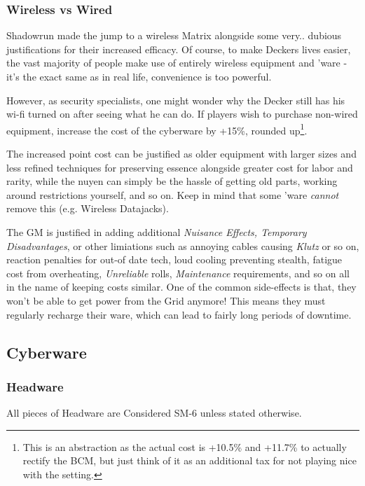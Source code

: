 \begin{multicols*}{3}
	\subsubsection{Wireless vs Wired}
	
	Shadowrun made the jump to a wireless Matrix alongside some very.. dubious justifications for their increased efficacy. Of course, to make Deckers lives easier, the vast majority of people make use of entirely wireless equipment and 'ware - it's the exact same as in real life, convenience is too powerful. 
	
	However, as security specialists, one might wonder why the Decker still has his wi-fi turned on after seeing what he can do. If players wish to purchase non-wired equipment, increase the cost of the cyberware by +15\%, rounded up\footnote{This is an abstraction as the actual cost is +10.5\% and +11.7\% to actually rectify the BCM, but just think of it as an additional tax for not playing nice with the setting.}.
	
	The increased point cost can be justified as older equipment with larger sizes and less refined techniques for preserving essence alongside greater cost for labor and rarity, while the nuyen can simply be the hassle of getting old parts, working around restrictions yourself, and so on. Keep in mind that some 'ware \textit{cannot} remove this (e.g. Wireless Datajacks). 
	
	The GM is justified in adding additional \textit{Nuisance Effects, Temporary Disadvantages}, or other limiations such as annoying cables causing \textit{Klutz} or so on, reaction penalties for out-of date tech, loud cooling preventing stealth, fatigue cost from overheating, \textit{Unreliable} rolls, \textit{Maintenance} requirements, and so on all in the name of keeping costs similar. One of the common side-effects is that, they won't be able to get power from the Grid anymore! This means they must regularly recharge their ware, which can lead to fairly long periods of downtime.
	
	\subsection{Cyberware}
	
	\subsubsection{Headware}
	
	All pieces of Headware are Considered SM-6 unless stated otherwise.
	

\end{multicols*}
